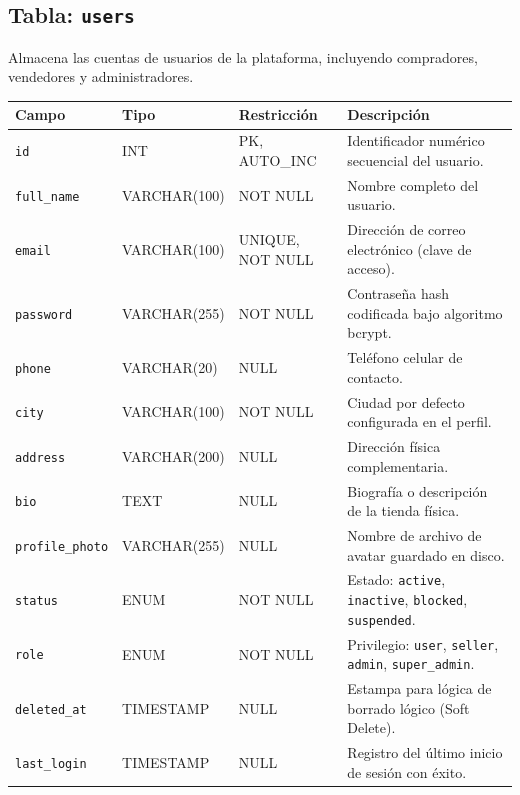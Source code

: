 \documentclass[11pt,a4paper]{report}
\begin{document}
\subsection{Tabla: \texttt{users}}
Almacena las cuentas de usuarios de la plataforma, incluyendo compradores, vendedores y administradores.
\begin{table}[H]
\centering
\begin{tabularx}{\textwidth}{|l|l|l|L|}
\hline
{}\textbf{Campo} & \textbf{Tipo} & \textbf{Restricción} & \textbf{Descripción} \\ \hline
\texttt{id} & INT & PK, AUTO\_INC & Identificador numérico secuencial del usuario. \\ \hline
\texttt{full\_name} & VARCHAR(100) & NOT NULL & Nombre completo del usuario. \\ \hline
\texttt{email} & VARCHAR(100) & UNIQUE, NOT NULL & Dirección de correo electrónico (clave de acceso). \\ \hline
\texttt{password} & VARCHAR(255) & NOT NULL & Contraseña hash codificada bajo algoritmo bcrypt. \\ \hline
\texttt{phone} & VARCHAR(20) & NULL & Teléfono celular de contacto. \\ \hline
\texttt{city} & VARCHAR(100) & NOT NULL & Ciudad por defecto configurada en el perfil. \\ \hline
\texttt{address} & VARCHAR(200) & NULL & Dirección física complementaria. \\ \hline
\texttt{bio} & TEXT & NULL & Biografía o descripción de la tienda física. \\ \hline
\texttt{profile\_photo} & VARCHAR(255) & NULL & Nombre de archivo de avatar guardado en disco. \\ \hline
\texttt{status} & ENUM & NOT NULL & Estado: \texttt{active}, \texttt{inactive}, \texttt{blocked}, \texttt{suspended}. \\ \hline
\texttt{role} & ENUM & NOT NULL & Privilegio: \texttt{user}, \texttt{seller}, \texttt{admin}, \texttt{super\_admin}. \\ \hline
\texttt{deleted\_at} & TIMESTAMP & NULL & Estampa para lógica de borrado lógico (Soft Delete). \\ \hline
\texttt{last\_login} & TIMESTAMP & NULL & Registro del último inicio de sesión con éxito. \\ \hline
\end{tabularx}
\end{table}
\end{document}
